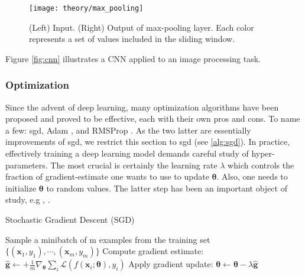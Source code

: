 \begin{figure}[!htpb]
  \texttt{[image: theory/max\_pooling]}
  \caption{(Left) Input. (Right) Output of max-pooling layer. Each color represents a set of values included in the sliding window.}
  \label{fig:max_pool}
\end{figure}
Figure \ref{fig:cnn} illustrates a CNN applied to an image processing task.

\subsubsection{Optimization}
Since the advent of deep learning, many optimization algorithms have been proposed and proved to be effective, each with their own pros and cons.
To name a few: \gls{sgd}, Adam \cite{kingma14}, and RMSProp \cite{tieleman12}.
As the two latter are essentially improvements of \gls{sgd}, we restrict this section to \gls{sgd} (see \ref{alg:sgd}).
In practice, effectively training a deep learning model demands careful study of hyper-parameters.
The most crucial is certainly the learning rate $\lambda$ which controls the fraction of gradient-estimate one wants to use to update $\bm{\theta}$.
Also, one needs to initialize $\bm{\theta}$ to random values.
The latter step has been an important object of study, e.g \cite{he15}, \cite{glorot10}.

\begin{algorithm}[H]
  \label{alg:sgd}
 \caption{Stochastic Gradient Descent (SGD)}

 \begin{algorithmic}[1]
  \Repeat
    \State Sample a minibatch of m examples from the training set $\{(\bm{x}_{1},y_{1}), \cdots, (\bm{x}_{m},y_{m})\}$
    \State Compute gradient estimate: $\hat{\bm{g}} \leftarrow + \frac{1}{m} \nabla_{\bm{\theta}}\sum_{i}\mathcal{L}(f(\bm{x}_{i}; \bm{\theta}), y_{i})$
    \State Apply gradient update: $\bm{\theta} \leftarrow \bm{\theta} - \lambda \hat{\bm{g}}$
  \end{algorithmic}
\end{algorithm}


